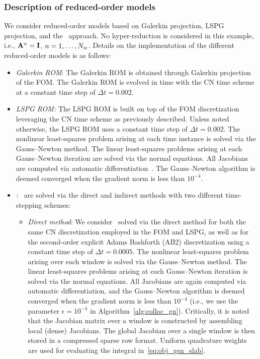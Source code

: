 \subsubsection{Description of reduced-order models}
We consider reduced-order models based on Galerkin projection, LSPG
projection, and the \methodAcronym\ approach. No hyper-reduction is considered 
in this example, i.e., $\mathbf{A}^{n} = \mathbf{I}$, $n=1,\ldots,N_w$. Details on the implementation of the 
different reduced-order models is as follows:
\begin{itemize}
\item \textit{Galerkin ROM}: The Galerkin ROM is obtained through Galerkin projection of the FOM. The Galerkin ROM is evolved in time with the CN time scheme at 
a constant time step of $ \Delta t = 0.002$.

\item \textit{LSPG ROM:} The LSPG ROM is built on top of the FOM
	discretization leveraging the CN time scheme as previously described. Unless
		noted otherwise, the LSPG ROM uses a constant time step of $\Delta t =
		0.002$. The nonlinear least-squares problem arising at each time instance
		is solved via the Gauss--Newton method. The linear least-squares problems
		arising at each Gauss--Newton iteration are solved via the normal
		equations. All Jacobians are computed via automatic
		differentiation~\cite{adolc}. The Gauss--Newton algorithm is deemed
		converged when the gradient norm is less than $10^{-4}$. 
\item \textit{\methodAcronymROM:} \methodAcronymROMs\ are solved via the
	direct and indirect methods with two different time-stepping schemes:
\begin{itemize}
	\item \textit{Direct method}: We consider \methodAcronymROMs\ solved via the direct method for both the same CN discretization employed in the FOM and LSPG, as well as for the second-order explicit Adams Bashforth (AB2) discretization using a constant time step of $\Delta t = 0.0005$. The nonlinear least-squares problem 
arising over each window is solved via the Gauss--Newton method. The linear
		least-squares problems arising at each Gauss--Newton iteration is solved
		via the normal equations. All Jacobians are again computed via automatic
		differentiation, and the Gauss--Newton algorithm is deemed converged when
		the gradient norm is less than $10^{-4}$ (i.e., we use the parameter $\epsilon = 10^{-4}$ in Algorithm~\ref{alg:colloc_gn}). Critically, it is noted that the Jacobian 
matrix over a window is constructed by assembling local (dense) Jacobians. The global Jacobian over a single window is then stored in a compressed sparse row format. Uniform quadrature weights are used for evaluating the integral in~\eqref{eq:obj_gen_slab}. 


\end{itemize}
\end{itemize}
